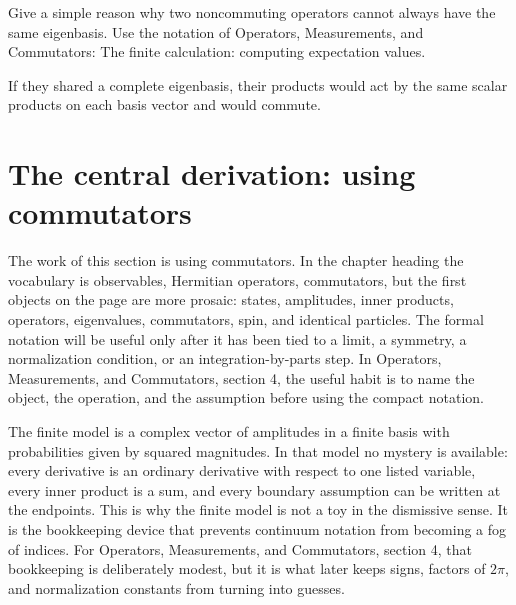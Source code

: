 \begin{exercise}
Give a simple reason why two noncommuting operators cannot always have the same eigenbasis.  Use the notation of Operators, Measurements, and Commutators: The finite calculation: computing expectation values.
\begin{answer}
If they shared a complete eigenbasis, their products would act by the same scalar products on each basis vector and would commute.
\end{answer}
\end{exercise}



\section{The central derivation: using commutators}













The work of this section is using commutators.  In the chapter heading the vocabulary is observables, Hermitian operators, commutators, but the first objects on the page are more prosaic: states, amplitudes, inner products, operators, eigenvalues, commutators, spin, and identical particles.  The formal notation will be useful only after it has been tied to a limit, a symmetry, a normalization condition, or an integration-by-parts step.  In Operators, Measurements, and Commutators, section 4, the useful habit is to name the object, the operation, and the assumption before using the compact notation.

The finite model is a complex vector of amplitudes in a finite basis with probabilities given by squared magnitudes.  In that model no mystery is available: every derivative is an ordinary derivative with respect to one listed variable, every inner product is a sum, and every boundary assumption can be written at the endpoints.  This is why the finite model is not a toy in the dismissive sense.  It is the bookkeeping device that prevents continuum notation from becoming a fog of indices.  For Operators, Measurements, and Commutators, section 4, that bookkeeping is deliberately modest, but it is what later keeps signs, factors of \(2\pi\), and normalization constants from turning into guesses.

